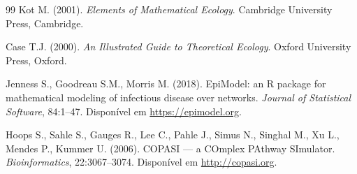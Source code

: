 \begin{thebibliography}{99}
 Kot M. (2001). \textit{Elements of Mathematical Ecology}.
Cambridge University Press, Cambridge.

 Case T.J. (2000). \textit{An Illustrated Guide to Theoretical
Ecology}. Oxford University Press, Oxford.

 Jenness S., Goodreau S.M., Morris M. (2018). EpiModel: an
R package for mathematical modeling of infectious disease over networks.
\textit{Journal of Statistical Software}, 84:1--47. Disponível em
\url{https://epimodel.org}.

 Hoops S., Sahle S., Gauges R., Lee C., Pahle J., Simus N.,
Singhal M., Xu L., Mendes P., Kummer U. (2006). COPASI --- a COmplex PAthway
SImulator. \textit{Bioinformatics}, 22:3067--3074. Disponível em
\url{http://copasi.org}.
\end{thebibliography}
